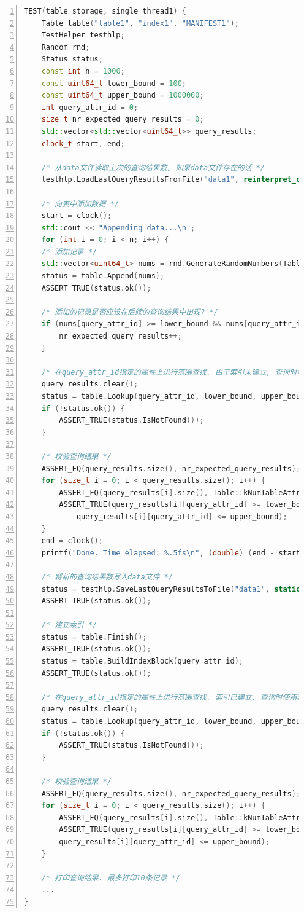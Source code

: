 \documentclass[bachelor]{thesis-uestc}
\begin{document}
\begin{lstlisting}[language=C++, basicstyle=\ttfamily\tiny, numbers=left, numberstyle=\tiny, keywordstyle=\color{blue!70}, commentstyle=\color{red!50!green!50!blue!50}, frame=shadowbox, rulesepcolor=\color{red!20!green!20!blue!20}]
TEST(table_storage, single_thread1) {
	Table table("table1", "index1", "MANIFEST1");
	TestHelper testhlp;
	Random rnd;
	Status status;
	const int n = 1000;
	const uint64_t lower_bound = 100;
	const uint64_t upper_bound = 1000000;
	int query_attr_id = 0;
	size_t nr_expected_query_results = 0;
	std::vector<std::vector<uint64_t>> query_results;
	clock_t start, end;
	
	/* 从data文件读取上次的查询结果数, 如果data文件存在的话 */
	testhlp.LoadLastQueryResultsFromFile("data1", reinterpret_cast<int*>(&nr_expected_query_results));
	
	/* 向表中添加数据 */
	start = clock();
	std::cout << "Appending data...\n";
	for (int i = 0; i < n; i++) {
	/* 添加记录 */
	std::vector<uint64_t> nums = rnd.GenerateRandomNumbers(Table::kNumTableAttributes);
	status = table.Append(nums);
	ASSERT_TRUE(status.ok());
	
	/* 添加的记录是否应该在后续的查询结果中出现? */
	if (nums[query_attr_id] >= lower_bound && nums[query_attr_id] <= upper_bound) {
		nr_expected_query_results++;
	}
	
	/* 在query_attr_id指定的属性上进行范围查找. 由于索引未建立, 查询时需要读取table_file */
	query_results.clear();
	status = table.Lookup(query_attr_id, lower_bound, upper_bound, &query_results);
	if (!status.ok()) {
		ASSERT_TRUE(status.IsNotFound());
	}
	
	/* 校验查询结果 */
	ASSERT_EQ(query_results.size(), nr_expected_query_results);
	for (size_t i = 0; i < query_results.size(); i++) {
		ASSERT_EQ(query_results[i].size(), Table::kNumTableAttributes);
		ASSERT_TRUE(query_results[i][query_attr_id] >= lower_bound &&
			query_results[i][query_attr_id] <= upper_bound);
	}
	end = clock();
	printf("Done. Time elapsed: %.5fs\n", (double) (end - start) / CLOCKS_PER_SEC);
	
	/* 将新的查询结果数写入data文件 */
	status = testhlp.SaveLastQueryResultsToFile("data1", static_cast<int>(nr_expected_query_results));
	ASSERT_TRUE(status.ok());
	
	/* 建立索引 */
	status = table.Finish();
	ASSERT_TRUE(status.ok());
	status = table.BuildIndexBlock(query_attr_id);
	ASSERT_TRUE(status.ok());
	
	/* 在query_attr_id指定的属性上进行范围查找. 索引已建立, 查询时使用索引加速查找 */
	query_results.clear();
	status = table.Lookup(query_attr_id, lower_bound, upper_bound, &query_results);
	if (!status.ok()) {
		ASSERT_TRUE(status.IsNotFound());
	}
	
	/* 校验查询结果 */
	ASSERT_EQ(query_results.size(), nr_expected_query_results);
	for (size_t i = 0; i < query_results.size(); i++) {
		ASSERT_EQ(query_results[i].size(), Table::kNumTableAttributes);
		ASSERT_TRUE(query_results[i][query_attr_id] >= lower_bound &&
		query_results[i][query_attr_id] <= upper_bound);
	}
	
	/* 打印查询结果. 最多打印10条记录 */
	...
}
\end{lstlisting}
\end{document}

